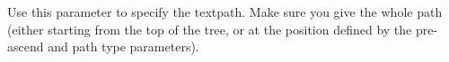 
Use this parameter to specify the textpath. Make sure you give the whole path (either starting from the top of the tree, or at the position defined by the pre-ascend and path type parameters).


